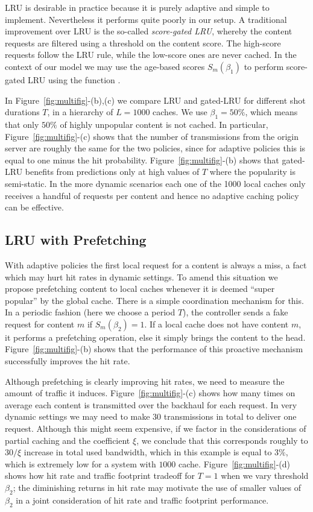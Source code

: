 \documentclass[10pt, conference, letterpaper]{IEEEtran}
\begin{document}
LRU is desirable in practice because it is purely adaptive
and simple to implement. 
Nevertheless it performs quite poorly in our setup. A traditional improvement over LRU is the so-called \emph{score-gated LRU}, whereby the content requests are filtered using a threshold on the content score. The high-score requests follow the LRU rule, while the low-score ones are never cached. 
In the context of our model we may use the age-based scores  $S_m(\beta_1)$ to  
perform score-gated LRU using the function . 

In Figure~\ref{fig:multifig}-(b),(c) we compare LRU and gated-LRU for different shot durations $T$, in a hierarchy of $L=1000$ caches. 
We use $\beta_1=50\%$, which means that only $50\%$ of highly unpopular content is not cached.
In particular, Figure~\ref{fig:multifig}-(c) shows that the number of transmissions from the origin server are roughly the same for the two policies, since for adaptive policies this is equal to one minus the hit probability.
Figure~\ref{fig:multifig}-(b) shows that gated-LRU benefits from predictions only at high values of $T$ where the popularity is semi-static. In the more dynamic scenarios each one of the 1000 local caches only receives a handful of requests per content and hence no adaptive caching policy can be effective.

\subsection{LRU with Prefetching}

With adaptive policies the first local request for a content is always a miss, a fact which may hurt hit rates in dynamic settings. 
To amend this situation we propose prefetching content to local caches whenever it is deemed ``super popular'' by the global cache.
There is a simple coordination mechanism for this.
In a periodic fashion (here we choose a period $T$), the controller sends a fake request for content $m$ if $S_m(\beta_2)=1$. If a local cache does not have content $m$, it performs a prefetching operation, else it simply brings the content to the head.
Figure~\ref{fig:multifig}-(b) shows that the performance of this proactive mechanism successfully improves the hit rate.
	
	Although prefetching is clearly improving hit rates, 
	we need to measure the amount of traffic it induces.
Figure~\ref{fig:multifig}-(c) shows how many times on average each content is transmitted over the backhaul for each request.
In very dynamic settings we may need to make 30 transmissions in total to deliver one request. Although this might seem expensive, if we factor in the considerations of partial caching and the coefficient $\xi$, we conclude that this corresponds roughly to $30/\xi$ increase in total used bandwidth, which in this example is equal to $3\%$, which is extremely low for a system with $1000$ cache. 
Figure~\ref{fig:multifig}-(d) shows how hit rate and traffic footprint tradeoff for $T=1$ when we vary threshold $\beta_2$; the diminishing returns in hit rate may motivate the use of smaller values of $\beta_2$ in a joint consideration of hit rate and traffic footprint performance.
 
\end{document}

